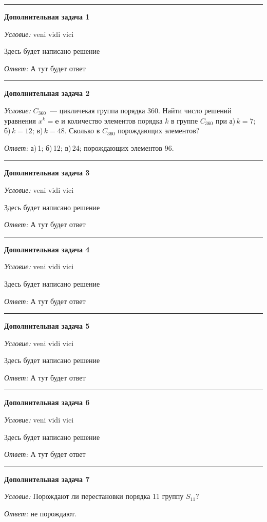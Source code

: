 \documentclass[12pt,a4paper]{article}
\newcommand{\sbs}{\large \bfseries}
\newcommand{\rl}{\vspace{16pt} \hrule \vspace{8pt}}
\begin{document}
\rl
{\sbs Дополнительная задача 1}

{\itshape Условие: } veni vidi vici

Здесь будет написано решение

{\itshape Ответ: } А тут будет ответ





\rl
{\sbs Дополнительная задача 2}

{\itshape Условие: } $C_{360}$~--- цикличекая группа порядка 360. Найти число решений уравнения $x^k=\boldsymbol{e}$ и количество элементов порядка $k$ в группе $C_{360}$ при а)\,$k = 7$; б)\,$k = 12$; в)\,$k = 48$. Сколько в $C_{360}$ порождающих элементов?


{\itshape Ответ: } а)\,1; б)\,12; в)\,24; порождающих элементов 96.




\rl
{\sbs Дополнительная задача 3}

{\itshape Условие: } veni vidi vici

Здесь будет написано решение

{\itshape Ответ: } А тут будет ответ




\rl
{\sbs Дополнительная задача 4}

{\itshape Условие: } veni vidi vici

Здесь будет написано решение

{\itshape Ответ: } А тут будет ответ




\rl
{\sbs Дополнительная задача 5}

{\itshape Условие: } veni vidi vici

Здесь будет написано решение

{\itshape Ответ: } А тут будет ответ




\rl
{\sbs Дополнительная задача 6}

{\itshape Условие: } veni vidi vici

Здесь будет написано решение

{\itshape Ответ: } А тут будет ответ




\rl
{\sbs Дополнительная задача 7}

{\itshape Условие: } Порождают ли перестановки порядка 11 группу $S_{11}$?



{\itshape Ответ:} не порождают.
\end{document}
